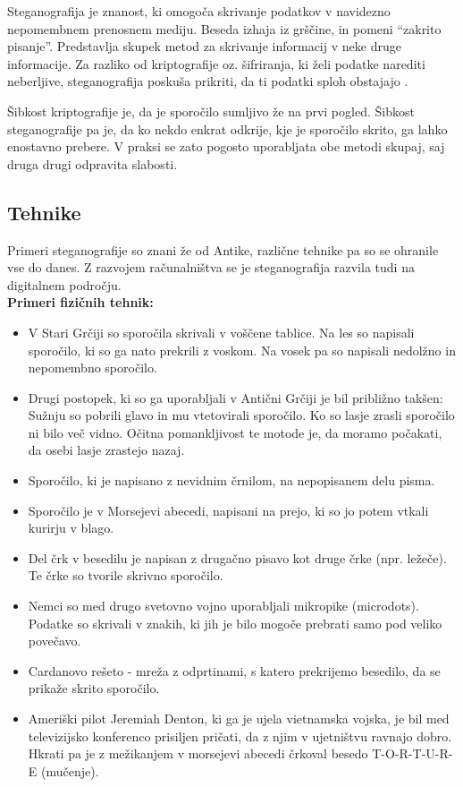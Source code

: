 Steganografija je znanost, ki omogoča skrivanje podatkov v navidezno nepomembnem prenosnem mediju. Beseda izhaja iz grščine, in pomeni ``zakrito pisanje''. Predstavlja skupek metod za skrivanje informacij v neke druge informacije. Za razliko od kriptografije oz. šifriranja, ki želi podatke narediti neberljive, steganografija poskuša prikriti, da ti podatki sploh obstajajo \cite{monitor}.

Šibkost kriptografije je, da je sporočilo sumljivo že na prvi pogled. Šibkost steganografije pa je, da ko nekdo enkrat odkrije, kje je sporočilo skrito, ga lahko enostavno prebere. V praksi se zato pogosto uporabljata obe metodi skupaj, saj druga drugi odpravita slabosti.

\subsection{Tehnike}
    Primeri steganografije so znani že od Antike, različne tehnike pa so se ohranile vse do danes. Z razvojem računalništva se je steganografija razvila tudi na digitalnem področju.\\

    \textbf{Primeri fizičnih tehnik:}
    \begin{itemize}
        \item V Stari Grčiji so sporočila skrivali v voščene tablice. Na les so napisali sporočilo, ki so ga nato prekrili z voskom. Na vosek pa so napisali nedolžno in nepomembno sporočilo.
        \item Drugi postopek, ki so ga uporabljali v Antični Grčiji je bil približno takšen: Sužnju so pobrili glavo in mu vtetovirali sporočilo. Ko so lasje zrasli sporočilo ni bilo več vidno. Očitna pomankljivost te motode je, da moramo počakati, da osebi lasje zrastejo nazaj.
        \item Sporočilo, ki je napisano z nevidnim črnilom, na nepopisanem delu pisma.
        \item Sporočilo je v Morsejevi abecedi, napisani na prejo, ki so jo potem vtkali kurirju  v blago.
        \item Del črk v besedilu je napisan z drugačno pisavo kot druge črke (npr. ležeče). Te črke so tvorile skrivno sporočilo. \cite{wikipedia}
        \item Nemci so med drugo svetovno vojno uporabljali mikropike (microdots). Podatke so skrivali v znakih, ki jih je bilo mogoče prebrati samo pod veliko povečavo. \cite{monitor}
        \item Cardanovo rešeto - mreža z odprtinami, s katero prekrijemo besedilo, da se prikaže skrito sporočilo.
        \item Ameriški pilot Jeremiah Denton, ki ga je ujela vietnamska vojska, je bil med televizijsko konferenco prisiljen pričati, da z njim v ujetništvu ravnajo dobro. Hkrati pa je z mežikanjem v morsejevi abecedi črkoval besedo T-O-R-T-U-R-E (mučenje).\cite{delo}
    \end{itemize}

